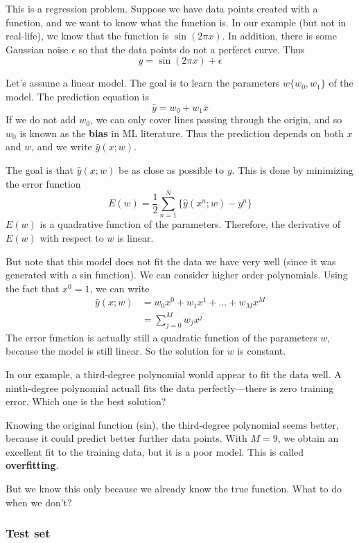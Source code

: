 \documentclass[a4paper,12pt]{article}
\begin{document}
This is a regression problem. Suppose we have data points created with a function, and we want to know what the function is. In our example (but not in real-life), we know that the function is $\sin(2\pi x)$. In addition, there is some Gaussian noise $\epsilon$ so that the data points do not a perferct curve. Thus 
$$y = \sin(2\pi x) + \epsilon$$ 

Let's assume a linear model. The goal is to learn the parameters $w \{w_0, w_1\}$ of the model. The prediction equation is 
$$\hat y = w_0 + w_1x$$
If we do not add $w_0$, we can only cover lines passing through the origin, and so $w_0$ is known as the \textbf{bias} in ML literature. Thus the prediction depends on both $x$ and $w$, and we write $\hat y(x; w)$. 

The goal is that $\hat y(x; w)$ be as close as possible to $y$. This is done by minimizing the error function $$E(w) = \frac{1}{2}\sum_{n=1}^N \{ \hat y (x^n; w) - y^n \}$$
$E(w)$ is a quadrative function of the parameters. Therefore, the derivative of $E(w)$ with respect to $w$ is linear. 

But note that this model does not fit the data we have very well (since it was generated with a sin function). We can consider higher order polynomials. Using the fact that $x^0 = 1$, we can write 
\begin{align*}
\hat y(x; w) &= w_0x^0 + w_1x^1 + ... + w_Mx^M\\ 
			&= \sum_{j=0}^M w_jx^j
\end{align*}
The error function is actually still a quadratic function of the parameters $w$, because the model is still linear. So the solution for $w$ is constant. 

In our example, a third-degree polynomial would appear to fit the data well. A ninth-degree polynomial actuall fits the data perfectly---there is zero training error. Which one is the best solution? 

Knowing the original function (sin), the third-degree polynomial seems better, because it could predict better further data points. With $M=9$, we obtain an excellent fit to the training data, but it is a poor model. This is called \textbf{overfitting}. 

But we know this only because we already know the true function. What to do when we don't? 

\subsubsection{Test set}
\end{document}
